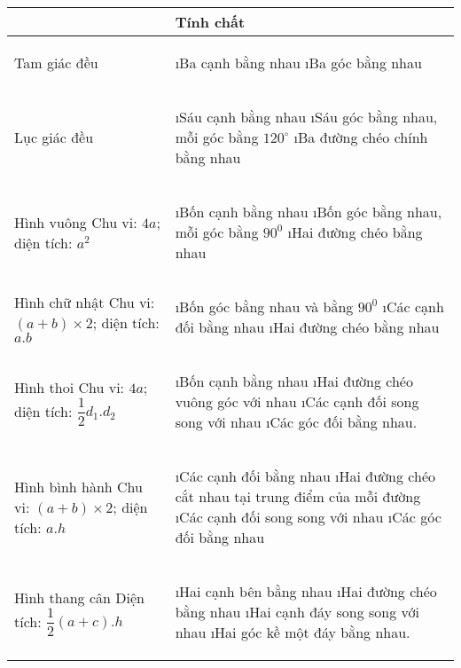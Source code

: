 \begin{tabular}{|p{}|p{}|}
	\hline
	&Tính chất\\
	\hline
	Tam giác đều&	\begin{enumerate}[--, leftmargin=*]
		\i Ba cạnh bằng nhau
		\i Ba góc bằng nhau
	\end{enumerate}\\
	\hline
	Lục giác đều&	\begin{enumerate}[--, leftmargin=*]
		\i Sáu cạnh bằng nhau
		\i Sáu góc bằng nhau, mỗi góc bằng $120^\circ$
		\i Ba đường chéo chính bằng nhau
	\end{enumerate}\\
	\hline
	Hình vuông
	Chu vi: $4a$; diện tích: $a^2$	&\begin{enumerate}[--, leftmargin=*]
		\i Bốn cạnh bằng nhau
		\i Bốn góc bằng nhau, mỗi góc bằng ${{90}^{0}}$
		\i Hai đường chéo bằng nhau
	\end{enumerate}\\
	\hline
	Hình chữ nhật
	Chu vi: $\left( a+b \right)\times 2$; diện tích: $a.b$& \begin{enumerate}[--, leftmargin=*]
		\i Bốn góc bằng nhau và bằng ${{90}^{0}}$
		\i Các cạnh đối bằng nhau
		\i Hai đường chéo bằng nhau
	\end{enumerate}\\	
	\hline
	Hình thoi
	Chu vi: $4a$; diện tích: $\dfrac{1}{2}{{d}_{1}}.{{d}_{2}}$&\begin{enumerate}[--, leftmargin=*]
		\i Bốn cạnh bằng nhau
		\i Hai đường chéo vuông góc với nhau
		\i Các cạnh đối song song với nhau
		\i Các góc đối bằng nhau.
	\end{enumerate}\\	
	\hline
	Hình bình hành
	Chu vi: $\left( a+b \right)\times 2$; diện tích: $a.h$&	
	\begin{enumerate}[--, leftmargin=*]
		\i Các cạnh đối bằng nhau
		\i Hai đường chéo cắt nhau tại trung điểm của mỗi đường
		\i Các cạnh đối song song với nhau
		\i Các góc đối bằng nhau
	\end{enumerate}\\
	\hline
	Hình thang cân
	Diện tích: $\dfrac{1}{2}\left( a+c \right).h$&
	\begin{enumerate}[--, leftmargin=*]
		\i Hai cạnh bên bằng nhau
		\i Hai đường chéo bằng nhau
		\i Hai cạnh đáy song song với nhau
		\i Hai góc kề một đáy bằng nhau.
	\end{enumerate}	\\
	\hline
\end{tabular}
